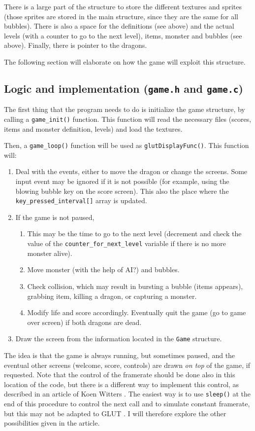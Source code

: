 \documentclass[12pt,a4paper]{article}
\begin{document}
There is a large part of the structure to store the different textures and sprites (those sprites are stored in the main structure, since they are the same for all bubbles). There is also a space for the definitions (see above) and the actual levels (with a counter to go to the next level), items, monster and bubbles (see above).  Finally, there is pointer to the dragons.

The following section will elaborate on how the game will exploit this structure.

\subsection{Logic and implementation (\texttt{game.h} and \texttt{game.c})}

The first thing that the program needs to do is initialize the game structure, by calling a \texttt{game_init()} function. This function will read the necessary files (scores, items and monster definition, levels) and load the textures.

Then, a \texttt{game_loop()} function will be used as \texttt{glutDisplayFunc()}. This function will:\begin{enumerate}
\item Deal with the events, either to move the dragon or change the screens. Some input event may be ignored if it is not possible (for example, using the blowing bubble key on the score screen). This also the place where the \texttt{key_pressed_interval[]} array is updated.
\item If the game is not paused, \begin{enumerate}
\item This may be the time to go to the next level (decrement and check the  value of the \texttt{counter_for_next_level} variable if there is no more monster alive).
\item Move monster (with the help of AI?) and bubbles.
\item Check collision, which may result in bursting a bubble (items appears), grabbing item, killing a dragon, or capturing a monster. 
\item Modify life and score accordingly. Eventually quit the game (go to game over screen) if both dragons are dead.
\end{enumerate}
\item Draw the screen from the information located in the \texttt{Game} structure.
\end{enumerate}
The idea is that the game is always running, but sometimes paused, and the eventual other screens (welcome, score, controls) are drawn \textit{on top} of the game, if requested. Note that the control of the framerate should be done also in this location of the code, but there is a different way to implement this control, as described in an article of Koen Witters \cite{fps}. The easiest way is to use \texttt{sleep()} at the end of this procedure to control the next call and to simulate constant framerate, but this may not be adapted to GLUT \cite{fps2}. I will therefore explore the other possibilities given in the article.
\end{document}
